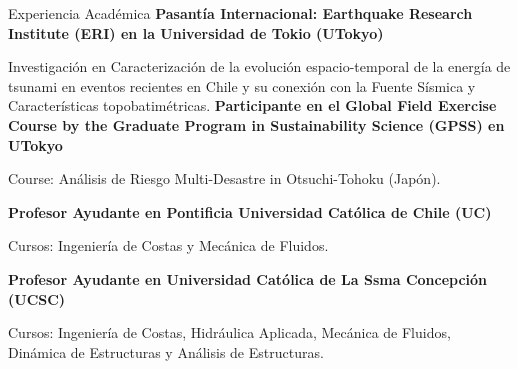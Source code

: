 \begin{rubric}{Experiencia Académica}
\entry*[2017 -- 2018]%
	\textbf{Pasantía Internacional: Earthquake Research Institute (ERI) en la Universidad de Tokio (UTokyo)}
	\par Investigación en Caracterización de la evolución espacio-temporal de la energía de tsunami en eventos recientes en Chile y su conexión con la Fuente Sísmica y Características topobatimétricas.
%
%
\entry*[2017]%
	\textbf{Participante en el Global Field Exercise Course by the Graduate Program in Sustainability Science (GPSS) en UTokyo}
	\par Course: Análisis de Riesgo Multi-Desastre in Otsuchi-Tohoku (Japón).

\entry*[2015 - 2019]%
	\textbf{Profesor Ayudante en Pontificia Universidad Cat\'olica de Chile (UC)}
	\par Cursos: Ingeniería de Costas y Mecánica de Fluidos.

\entry*[2011 - 2013]%
	\textbf{Profesor Ayudante en Universidad Cat\'olica de La Ssma Concepci\'on (UCSC)}
	\par Cursos: Ingeniería de Costas, Hidráulica Aplicada, Mecánica de Fluidos, Dinámica de Estructuras y Análisis de Estructuras.
\end{rubric}
